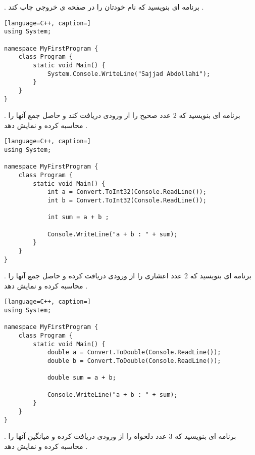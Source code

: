\documentclass[12pt]{article}
\begin{document}
. برنامه ای بنویسید که نام خودتان را در صفحه ی خروجی چاپ کند .

\begin{latin}
\begin{lstlisting}[language=C++, caption=]
using System;

namespace MyFirstProgram {
	class Program {
		static void Main() {
			System.Console.WriteLine("Sajjad Abdollahi");
		}
	}
}
\end{lstlisting}
\end{latin}



 . برنامه ای بنویسید که 2 عدد صحیح را از ورودی دریافت کند و حاصل جمع آنها را محاسبه کرده و نمایش دهد .


\begin{latin}
\begin{lstlisting}[language=C++, caption=]
using System;

namespace MyFirstProgram {
	class Program {
		static void Main() {
			int a = Convert.ToInt32(Console.ReadLine());
			int b = Convert.ToInt32(Console.ReadLine());
			
			int sum = a + b ;
			
			Console.WriteLine("a + b : " + sum);
		}
	}
}
\end{lstlisting}
\end{latin}




\newpage


 . برنامه ای بنویسید که 2 عدد اعشاری را از ورودی دریافت کرده و حاصل جمع آنها را محاسبه کرده و نمایش دهد .



\begin{latin}
\begin{lstlisting}[language=C++, caption=]
using System;

namespace MyFirstProgram {
	class Program {
		static void Main() {
			double a = Convert.ToDouble(Console.ReadLine());
			double b = Convert.ToDouble(Console.ReadLine());
			
			double sum = a + b;
			
			Console.WriteLine("a + b : " + sum);
		}
	}
}
\end{lstlisting}
\end{latin}



 . برنامه ای بنویسید که 3 عدد دلخواه را از ورودی دریافت کرده و میانگین آنها را محاسبه کرده و نمایش دهد .
\end{document}
